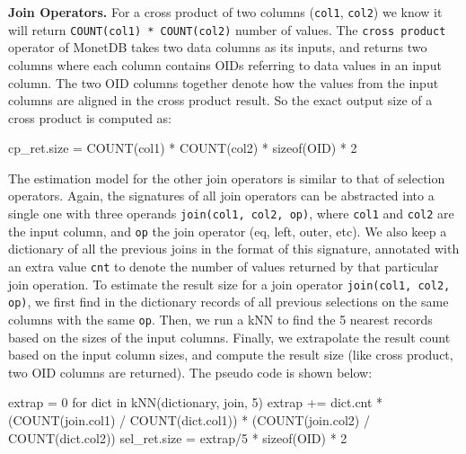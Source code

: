 \documentclass[conference]{IEEEtran}
\def\Skip{\par\medskip\nobreak\noindent}
\begin{document}
\Skip\textbf{Join Operators.}
%
For a cross product of two columns (\texttt{\small col1}, \texttt{\small col2}) we know it will return \texttt{\small COUNT(col1) * COUNT(col2)} number of values.
The \texttt{\small cross product} operator of MonetDB takes two data columns as its inputs, and returns two columns where each column contains OIDs referring to data values in an input column.
The two OID columns together denote how the values from the input columns are aligned in the cross product result.
So the exact output size of a cross product is computed as:
\begin{verb}
cp_ret.size = COUNT(col1) * COUNT(col2) * sizeof(OID) * 2
\end{verb}

The estimation model for the other join operators is similar to that of selection operators.
Again, the signatures of all join operators can be abstracted into a single one with three operands \texttt{\small join(col1, col2, op)}, where \texttt{\small col1} and \texttt{\small col2} are the input column, and \texttt{\small op} the join operator (eq, left, outer, etc).
We also keep a dictionary of all the previous joins in the format of this signature, annotated with an extra value \texttt{\small cnt} to denote the number of values returned by that particular join operation.
To estimate the result size for a join operator \texttt{\small join(col1, col2, op)}, we first find in the dictionary records of all previous selections on the same columns with the same \texttt{\small op}. 
Then, we run a kNN to find the 5 nearest records based on the sizes of the input columns.
Finally, we extrapolate the result count based on the input column sizes, and compute the result size (like cross product, two OID columns are returned).
The pseudo code is shown below:
\begin{verb}
extrap = 0
for dict in kNN(dictionary, join, 5)
  extrap += dict.cnt * (COUNT(join.col1) / COUNT(dict.col1)) * 
                       (COUNT(join.col2) / COUNT(dict.col2))
sel_ret.size = extrap/5 * sizeof(OID) * 2
\end{verb}
\end{document}
